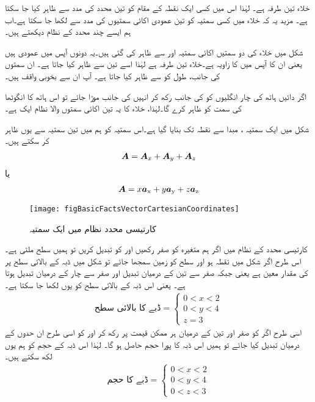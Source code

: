 	 خلاء تین طرفہ ہے۔ لہٰذا اس میں کسی ایک نقطہ کے مقام کو تین محدد کی مدد سے ظاہر کیا جا سکتا ہے۔ مزید یہ کہ خلاء میں کسی سمتیہ کو تین عمودی اکائی سمتیوں کی مدد سے لکھا جا سکتا ہے۔اب ہم ایسے چند محدد کے نظام دیکھتے ہیں۔

	شکل    میں خلاء کی دو سمتیں اکائی سمتیہ  اور  سے ظاہر کی گئی ہیں۔یہ دونوں  آپس میں عمودی ہیں یعنی ان کا آپس میں   کا زاویہ ہے۔خلاء تین طرفہ ہے لہٰذا اسے تین  سے ظاہر کیا جاتا ہے۔ ان سمتوں کی جانب،  طول  کو  سے ظاہر کیا جاتا ہے۔ آپ ان سے بخوبی واقف ہیں۔ 


	 اگر دائیں ہاتھ کی چار انگلیوں کو  کی جانب رکھ کر انہیں  کی جانب موڑا جائے تو اس ہاتھ کا انگوٹھا  کی سمت کو ظاہر کرے گا۔لہٰذا،  خلاء کا  یہ  تین اکائی سمتوں والا نظام ایک   ہے۔

	شکل   میں ایک سمتیہ ، مبدا سے نقطہ  تک بنایا گیا ہے۔اس سمتیہ کو ہم  میں تین سمتیہ سے یوں ظاہر کر سکتے ہیں۔
\begin{align}
{\ensuremath{{\boldsymbol{A}}}}={{\boldsymbol{A}}}_x+{{\boldsymbol{A}}}_y+{{\boldsymbol{A}}}_z
\end{align}
یا
\begin{align}
{\ensuremath{{\boldsymbol{A}}}}=x{\boldsymbol{a}}_{\textup{x}}+y{\boldsymbol{a}}_{\textup{y}}+z{\boldsymbol{a}}_{\textup{z}}
\end{align}
%
\begin{figure}
\centering
\texttt{[image: figBasicFactsVectorCartesianCoordinates]}
\caption{کارتیسی محدد نظام میں ایک سمتیہ}
\label{شکل_حقائق_کارتیسی_نظام_ایک_سمتیہ}
\end{figure}
%
کارتیسی محدد کے نظام میں اگر ہم متغیرہ  کو صفر رکھیں اور  کو تبدیل کریں تو ہمیں  سطح  ملتی ہے۔ اس طرح اگر شکل   میں نقطہ  ہو اور  سطح کو زمین سمجھا جائے  تو شکل میں ڈبہ کے بالائی سطح پر   کی مقدار معین ہے یعنی   جبکہ  صفر سے تین کے درمیان تبدیل اور  صفر سے چار کے درمیان تبدیل ہوتا ہے۔ یعنی اس ڈبہ کے بالائی سطح کو یوں لکھا جا سکتا ہے۔ 
\begin{align}
 \text{ڈبے کا بالائی سطح}= \left\{ 
  \begin{array}{l}
    0<x<2\\
    0<y<4 \\
	 z=3
  \end{array} \right.
\end{align}
اسی طرح اگر  کو صفر اور تین کے درمیان ہر ممکن قیمت پر رکھ کر  اور  کو اسی طرح ان حدوں کے درمیان تبدیل کیا جائے تو ہمیں اس ڈبہ کا پورا حجم حاصل ہو گا۔ لہٰذا اس ڈبہ کے حجم کو ہم یوں لکھ سکتے ہیں۔
\begin{align}
 \text{ڈبے کا حجم}= \left\{ 
  \begin{array}{l}
    0<x<2\\
    0<y<4 \\
    0<z<3
  \end{array} \right.
\end{align}

